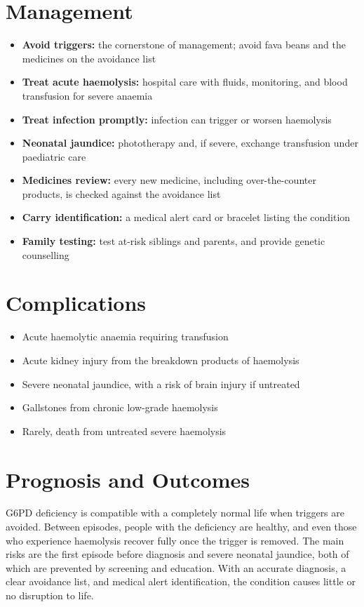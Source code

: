 \section*{Management}
\begin{itemize}
    \item \textbf{Avoid triggers:} the cornerstone of management; avoid fava beans and the medicines on the avoidance list
    \item \textbf{Treat acute haemolysis:} hospital care with fluids, monitoring, and blood transfusion for severe anaemia
    \item \textbf{Treat infection promptly:} infection can trigger or worsen haemolysis
    \item \textbf{Neonatal jaundice:} phototherapy and, if severe, exchange transfusion under paediatric care
    \item \textbf{Medicines review:} every new medicine, including over-the-counter products, is checked against the avoidance list
    \item \textbf{Carry identification:} a medical alert card or bracelet listing the condition
    \item \textbf{Family testing:} test at-risk siblings and parents, and provide genetic counselling
\end{itemize}

\section*{Complications}
\begin{itemize}
    \item Acute haemolytic anaemia requiring transfusion
    \item Acute kidney injury from the breakdown products of haemolysis
    \item Severe neonatal jaundice, with a risk of brain injury if untreated
    \item Gallstones from chronic low-grade haemolysis
    \item Rarely, death from untreated severe haemolysis
\end{itemize}

\section*{Prognosis and Outcomes}
G6PD deficiency is compatible with a completely normal life when triggers are avoided. Between episodes, people with the deficiency are healthy, and even those who experience haemolysis recover fully once the trigger is removed. The main risks are the first episode before diagnosis and severe neonatal jaundice, both of which are prevented by screening and education. With an accurate diagnosis, a clear avoidance list, and medical alert identification, the condition causes little or no disruption to life.

